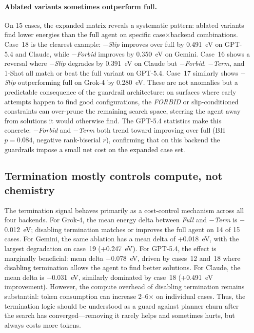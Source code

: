 \paragraph{Ablated variants sometimes outperform full.}
On 15 cases, the expanded matrix reveals a systematic pattern: ablated variants find lower energies than the full agent on specific case$\times$backend combinations.
Case~18 is the clearest example: \textit{$-$Slip} improves over full by 0.491~eV on GPT-5.4 and Claude, while \textit{$-$Forbid} improves by 0.350~eV on Gemini.
Case~16 shows a reversal where \textit{$-$Slip} degrades by 0.391~eV on Claude but \textit{$-$Forbid}, \textit{$-$Term}, and 1-Shot all match or beat the full variant on GPT-5.4.
Case~17 similarly shows \textit{$-$Slip} outperforming full on Grok-4 by 0.280~eV.
These are not anomalies but a predictable consequence of the guardrail architecture: on surfaces where early attempts happen to find good configurations, the \textit{FORBID} or slip-conditioned constraints can over-prune the remaining search space, steering the agent away from solutions it would otherwise find.
The GPT-5.4 statistics make this concrete: \textit{$-$Forbid} and \textit{$-$Term} both trend toward improving over full (BH~$p = 0.084$, negative rank-biserial $r$), confirming that on this backend the guardrails impose a small net cost on the expanded case set.

\subsection{Termination mostly controls compute, not chemistry}

The termination signal behaves primarily as a cost-control mechanism across all four backends.
For Grok-4, the mean energy delta between \textit{Full} and \textit{$-$Term} is $-$0.012~eV; disabling termination matches or improves the full agent on 14 of 15 cases.
For Gemini, the same ablation has a mean delta of +0.018~eV, with the largest degradation on case~19 (+0.247~eV).
For GPT-5.4, the effect is marginally beneficial: mean delta $-$0.078~eV, driven by cases~12 and~18 where disabling termination allows the agent to find better solutions.
For Claude, the mean delta is $-$0.031~eV, similarly dominated by case~18 (+0.491~eV improvement).
However, the compute overhead of disabling termination remains substantial: token consumption can increase 2--6$\times$ on individual cases.
Thus, the termination logic should be understood as a guard against planner churn after the search has converged---removing it rarely helps and sometimes hurts, but always costs more tokens.

